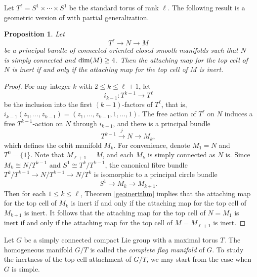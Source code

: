 \documentclass[a4]{amsart}
\newtheorem{proposition}[theorem]{Proposition}
\theoremstyle{definition}
\begin{document}
\begin{sloppypar}
Let $T^\ell=S^1\times \cdots \times S^1$ be the standard torus of rank $\ell$. The following result is a geometric version of \cite[Theorem 8.6]{The24b} with partial generalization. 
\begin{proposition}\label{TNMinertthm}
Let 
\[
T^\ell\stackrel{}{\longrightarrow} N\stackrel{}{\longrightarrow} M
\]
be a principal bundle of connected oriented closed smooth manifolds such that $N$ is simply connected and ${\rm dim}(M)\geq 4$. Then the attaching map for the top cell of $N$ is inert if and only if the attaching map for the top cell of $M$ is inert.
\end{proposition}
\begin{proof}
For any integer $k$ with $2\leq k\leq \ell+1$, let 
\[
i_{k-1}: T^{k-1}\stackrel{}{\longrightarrow}T^{\ell}
\]
be the inclusion into the first $(k-1)$-factors of $T^\ell$, that is, $i_{k-1}(z_1,\ldots, z_{k-1})=(z_1,\ldots, z_{k-1}, 1,\ldots, 1)$. The free action of $T^\ell$ on $N$ induces a free $T^{k-1}$-action on $N$ through $i_{k-1}$, and there is a principal bundle 
\[
T^{k-1}\stackrel{j}{\longrightarrow} N\stackrel{}{\longrightarrow} M_k,
\]
which defines the orbit manifold $M_k$. For convenience, denote $M_1=N$ and $T^0=\{1\}$. Note that $M_{\ell+1}=M$, and each $M_k$ is simply connected as $N$ is. Since $M_k\cong N/T^{k-1}$ and $S^1\cong T^{k}/T^{k-1}$, the canonical fibre bundle $T^{k}/T^{k-1}\stackrel{}{\longrightarrow} N/T^{k-1}\stackrel{}{\longrightarrow} N/T^{k}$ is isomorphic to a principal circle bundle
\[
S^{1}\stackrel{}{\longrightarrow} M_k\stackrel{}{\longrightarrow} M_{k+1}.
\] 
Then for each $1\leq k\leq \ell$, Theorem \ref{geoinertthm} implies that the attaching map for the top cell of $M_{k}$ is inert if and only if the attaching map for the top cell of $M_{k+1}$ is inert. It follows that the attaching map for the top cell of $N=M_{1}$ is inert if and only if the attaching map for the top cell of $M=M_{\ell+1}$ is inert. 
\end{proof}


Let $G$ be a simply connected compact Lie group with a maximal torus $T$. The homogeneous manifold $G/T$ is called the {\it complete flag manifold} of $G$. To study the inertness of the top cell attachment of $G/T$, we may start from the case when $G$ is simple. 


\end{sloppypar}
\end{document}
